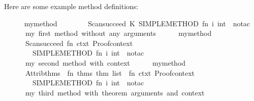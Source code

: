 \begin{isabellebody}
\begin{isamarkuptext}
\begin{description}
  Here are some example method definitions:

  \end{description}%
\end{isamarkuptext}%
\isamarkuptrue%
%
\isadelimML
\ \ \ \ %
\endisadelimML
%
\isatagML
{}\isamarkupfalse%
\ my{\isacharunderscore}method{}\ {\isacharequal}\ {\isacharverbatimopen}\isanewline
\ \ \ \ \ \ Scan{\isachardot}succeed\ {\isacharparenleft}K\ {\isacharparenleft}SIMPLE{\isacharunderscore}METHOD{\isacharprime}\ {\isacharparenleft}fn\ i{\isacharcolon}\ int\ {\isacharequal}{\isachargreater}\ no{\isacharunderscore}tac{\isacharparenright}{\isacharparenright}{\isacharparenright}\isanewline
\ \ \ \ {\isacharverbatimclose}\ \ {\isachardoublequoteopen}my\ first\ method\ {\isacharparenleft}without\ any\ arguments{\isacharparenright}{\isachardoublequoteclose}\isanewline
\isanewline
\ \ \ \ \isamarkupfalse%
\ my{\isacharunderscore}method{}\ {\isacharequal}\ {\isacharverbatimopen}\isanewline
\ \ \ \ \ \ Scan{\isachardot}succeed\ {\isacharparenleft}fn\ ctxt{\isacharcolon}\ Proof{\isachardot}context\ {\isacharequal}{\isachargreater}\isanewline
\ \ \ \ \ \ \ \ SIMPLE{\isacharunderscore}METHOD{\isacharprime}\ {\isacharparenleft}fn\ i{\isacharcolon}\ int\ {\isacharequal}{\isachargreater}\ no{\isacharunderscore}tac{\isacharparenright}{\isacharparenright}\isanewline
\ \ \ \ {\isacharverbatimclose}\ \ {\isachardoublequoteopen}my\ second\ method\ {\isacharparenleft}with\ context{\isacharparenright}{\isachardoublequoteclose}\isanewline
\isanewline
\ \ \ \ \isamarkupfalse%
\ my{\isacharunderscore}method{}\ {\isacharequal}\ {\isacharverbatimopen}\isanewline
\ \ \ \ \ \ Attrib{\isachardot}thms\ {\isachargreater}{\isachargreater}\ {\isacharparenleft}fn\ thms{\isacharcolon}\ thm\ list\ {\isacharequal}{\isachargreater}\ fn\ ctxt{\isacharcolon}\ Proof{\isachardot}context\ {\isacharequal}{\isachargreater}\isanewline
\ \ \ \ \ \ \ \ SIMPLE{\isacharunderscore}METHOD{\isacharprime}\ {\isacharparenleft}fn\ i{\isacharcolon}\ int\ {\isacharequal}{\isachargreater}\ no{\isacharunderscore}tac{\isacharparenright}{\isacharparenright}\isanewline
\ \ \ \ {\isacharverbatimclose}\ \ {\isachardoublequoteopen}my\ third\ method\ {\isacharparenleft}with\ theorem\ arguments\ and\ context{\isacharparenright}{\isachardoublequoteclose}%
\endisatagML
{\isafoldML}%
%
\isadelimML
%
\endisadelimML
%
\end{isabellebody}

